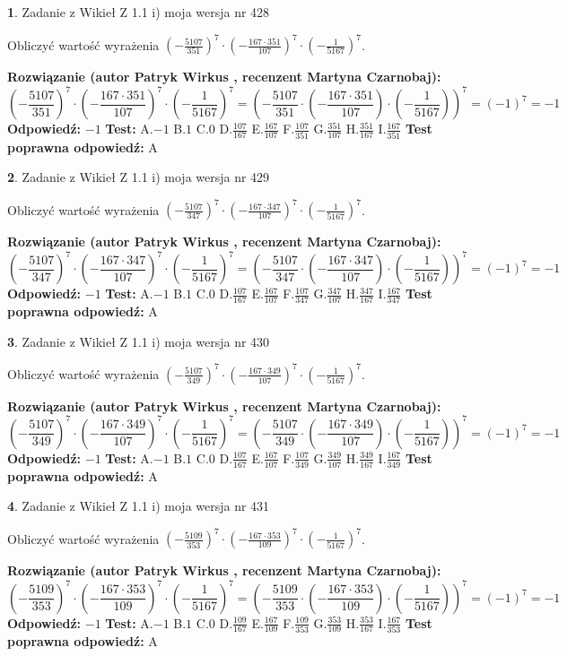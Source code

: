 \documentclass[12pt, a4paper]{article}
\theoremstyle{definition} %
\newtheorem{zad}{}
\newcommand{\zadStart}[1]{\begin{zad}#1\newline}
\newcommand{\zadStop}{\end{zad}}
\newcommand{\rozwStart}[2]{\noindent \textbf{Rozwiązanie (autor #1 , recenzent #2): }\newline}
\newcommand{\rozwStop}{\newline}
\newcommand{\odpStart}{\noindent \textbf{Odpowiedź:}\newline}
\newcommand{\odpStop}{\newline}
\newcommand{\testStart}{\noindent \textbf{Test:}\newline}
\newcommand{\testStop}{\newline}
\newcommand{\kluczStart}{\noindent \textbf{Test poprawna odpowiedź:}\newline}
\newcommand{\kluczStop}{\newline}
\begin{document}
\zadStart{Zadanie z Wikieł Z 1.1 i) moja wersja nr 428}

Obliczyć wartość wyrażenia $(-\frac{5107}{351})^{7} \cdot (-\frac{167 \cdot 351}{107})^{7} \cdot (-\frac{1}{5167})^{7}$.
\zadStop
\rozwStart{Patryk Wirkus}{Martyna Czarnobaj}
$$(-\frac{5107}{351})^{7} \cdot (-\frac{167 \cdot 351}{107})^{7} \cdot (-\frac{1}{5167})^{7} = (-\frac{5107}{351} \cdot (-\frac{167 \cdot 351}{107}) \cdot (-\frac{1}{5167}))^{7} = (-1)^{7} = -1$$
\rozwStop
\odpStart
$-1$
\odpStop
\testStart
A.$-1$ B.$1$ C.$0$ D.$\frac{107}{167}$ E.$\frac{167}{107}$
F.$\frac{107}{351}$ G.$\frac{351}{107}$
H.$\frac{351}{167}$
I.$\frac{167}{351}$
\testStop
\kluczStart
A
\kluczStop



\zadStart{Zadanie z Wikieł Z 1.1 i) moja wersja nr 429}

Obliczyć wartość wyrażenia $(-\frac{5107}{347})^{7} \cdot (-\frac{167 \cdot 347}{107})^{7} \cdot (-\frac{1}{5167})^{7}$.
\zadStop
\rozwStart{Patryk Wirkus}{Martyna Czarnobaj}
$$(-\frac{5107}{347})^{7} \cdot (-\frac{167 \cdot 347}{107})^{7} \cdot (-\frac{1}{5167})^{7} = (-\frac{5107}{347} \cdot (-\frac{167 \cdot 347}{107}) \cdot (-\frac{1}{5167}))^{7} = (-1)^{7} = -1$$
\rozwStop
\odpStart
$-1$
\odpStop
\testStart
A.$-1$ B.$1$ C.$0$ D.$\frac{107}{167}$ E.$\frac{167}{107}$
F.$\frac{107}{347}$ G.$\frac{347}{107}$
H.$\frac{347}{167}$
I.$\frac{167}{347}$
\testStop
\kluczStart
A
\kluczStop



\zadStart{Zadanie z Wikieł Z 1.1 i) moja wersja nr 430}

Obliczyć wartość wyrażenia $(-\frac{5107}{349})^{7} \cdot (-\frac{167 \cdot 349}{107})^{7} \cdot (-\frac{1}{5167})^{7}$.
\zadStop
\rozwStart{Patryk Wirkus}{Martyna Czarnobaj}
$$(-\frac{5107}{349})^{7} \cdot (-\frac{167 \cdot 349}{107})^{7} \cdot (-\frac{1}{5167})^{7} = (-\frac{5107}{349} \cdot (-\frac{167 \cdot 349}{107}) \cdot (-\frac{1}{5167}))^{7} = (-1)^{7} = -1$$
\rozwStop
\odpStart
$-1$
\odpStop
\testStart
A.$-1$ B.$1$ C.$0$ D.$\frac{107}{167}$ E.$\frac{167}{107}$
F.$\frac{107}{349}$ G.$\frac{349}{107}$
H.$\frac{349}{167}$
I.$\frac{167}{349}$
\testStop
\kluczStart
A
\kluczStop



\zadStart{Zadanie z Wikieł Z 1.1 i) moja wersja nr 431}

Obliczyć wartość wyrażenia $(-\frac{5109}{353})^{7} \cdot (-\frac{167 \cdot 353}{109})^{7} \cdot (-\frac{1}{5167})^{7}$.
\zadStop
\rozwStart{Patryk Wirkus}{Martyna Czarnobaj}
$$(-\frac{5109}{353})^{7} \cdot (-\frac{167 \cdot 353}{109})^{7} \cdot (-\frac{1}{5167})^{7} = (-\frac{5109}{353} \cdot (-\frac{167 \cdot 353}{109}) \cdot (-\frac{1}{5167}))^{7} = (-1)^{7} = -1$$
\rozwStop
\odpStart
$-1$
\odpStop
\testStart
A.$-1$ B.$1$ C.$0$ D.$\frac{109}{167}$ E.$\frac{167}{109}$
F.$\frac{109}{353}$ G.$\frac{353}{109}$
H.$\frac{353}{167}$
I.$\frac{167}{353}$
\testStop
\kluczStart
A
\kluczStop
\end{document}
